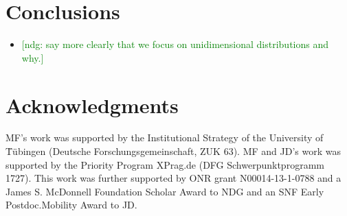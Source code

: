 \documentclass[10pt,letterpaper]{article}
\newcommand{\ndg}[1]{\textcolor{Green}{[ndg: #1]}}
\begin{document}
\section{Conclusions}

\begin{itemize}
\item \ndg{say more clearly that we focus on unidimensional distributions and why.}
\end{itemize}


\section{Acknowledgments}

MF's work was supported by the Institutional Strategy of the University of T̈\"{u}bingen (Deutsche
Forschungsgemeinschaft, ZUK 63). MF and JD's work was supported by the Priority Program XPrag.de (DFG Schwerpunktprogramm
1727). This work was further supported by ONR grant N00014-13-1-0788 and a James S. McDonnell Foundation Scholar Award to NDG and an SNF Early Postdoc.Mobility Award to JD.





\setlength{\bibleftmargin}{.125in}
\setlength{\bibindent}{-\bibleftmargin}


\end{document}

